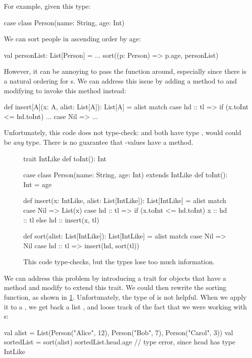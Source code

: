 \documentclass{book}
\begin{document}
For example, given this type:
\begin{scalacode}
case class Person(name: String, age: Int)
\end{scalacode}
We can sort people in ascending order by age:
\begin{scalacode}
val personList: List[Person] = ...
sort((p: Person) => p.age, personList)
\end{scalacode}

However, it can be annoying to pass the  function around,
especially since there is a natural ordering for s.
We can address this issue by adding a  method
to  and modifying  to invoke this
method instead:
\begin{scalacode}
def insert[A](x: A, alist: List[A]): List[A] = alist match {
  case hd :: tl => if (x.toInt <= hd.toInt) ...
  case Nil => ...
}
\end{scalacode}
Unfortunately, this code does not type-check:  and  both have type ,
would could be \emph{any} type. There is no guarantee that -values have a 
method.

\begin{figure}
\begin{scalacode}
trait IntLike {
  def toInt(): Int
}

case class Person(name: String, age: Int) extends IntLike {
  def toInt(): Int = age
}

def insert(x: IntLike, alist: List[IntLike]): List[IntLike] = alist match {
  case Nil => List(x)
  case hd :: tl => if (x.toInt <= hd.toInt) { x :: hd :: tl } else { hd :: insert(x, tl) }
}

def sort(alist: List[IntLike]): List[IntLike] = alist match {
  case Nil => Nil
  case hd :: tl => insert(hd, sort(tl))
}
\end{scalacode}
\caption{This code type-checks, but the types lose too much information.}
\label{sorting_fail}
\end{figure}

We can address this problem by introducing a trait for objects that have a
 method and modify  to extend this trait.
We could then rewrite the sorting function, as shown in \cref{sorting_fail}.
Unfortunately, the type of  is not helpful. When we apply
it to a , we get back a list ,
and loose track of the fact that we were working with s:
\begin{scalacode}
val alist = List(Person("Alice", 12), Person("Bob", 7), Person("Carol", 3))
val sortedList = sort(alist)
sortedList.head.age // type error, since head has type IntLike
\end{scalacode}
\end{document}
